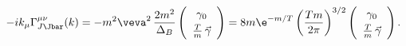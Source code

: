\begin{equation*}
  -ik_\mu\Gamma_{J\smash[t]{\Jbar}}^{\mu\nu}(k)=
  -m^2\veva^2\,\frac{2m^2}{\Delta_B}\left(\begin{array}{c}
  \gamma_0\\[1mm] \tfrac{T}{m}\,\vec\gamma\end{array}\right)
  =8m\e^{-m/T}\left(\frac{Tm}{2\pi}\right)^{3/2}\left(
  \begin{array}{c}\gamma_0\\[1mm] 
  \tfrac{T}{m}\,\vec\gamma\end{array}\right).
\end{equation*}

